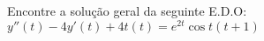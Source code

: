 \linespread{1.5}
Encontre a solução geral da seguinte E.D.O: $y''(t) - 4y'(t) + 4t(t) = e^{2t}\cos{t}(t+1)$